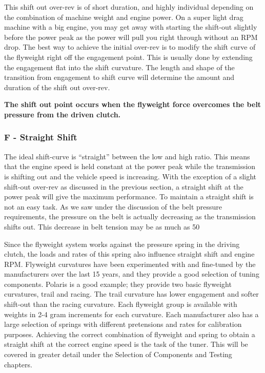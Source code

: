 \documentclass[12pt, titlepage]{article}
\begin{document}
This shift out over-rev is of short duration, and highly individual depending on the combination of machine weight and engine power. On a super light drag machine with a big engine, you may get away with starting the shift-out slightly before the power peak as the power will pull you right through without an RPM drop. The best way to achieve the initial over-rev is to modify the shift curve of the flyweight right off the engagement point. This is usually done by extending the engagement flat into the shift curvature. The length and shape of the transition from engagement to shift curve will determine the amount and duration of the shift out over-rev.

\textbf{The shift out point occurs when the flyweight force overcomes the belt pressure from the driven clutch.}

\subsubsection*{F - Straight Shift}

The ideal shift-curve is “straight” between the low and high ratio. This means that the engine speed is held constant at the power peak while the transmission is shifting out and the vehicle speed is increasing. With the exception of a slight shift-out over-rev as discussed in the previous section, a straight shift at the power peak will give the maximum performance. To maintain a straight shift is not an easy task. As we saw under the discussion of the belt pressure requirements, the pressure on the belt is actually decreasing as the transmission shifts out. This decrease in belt tension may be as much as 50%

Since the flyweight system works against the pressure spring in the driving clutch, the loads and rates of this spring also influence straight shift and engine RPM. Flyweight curvatures have been experimented with and fine-tuned by the manufacturers over the last 15 years, and they provide a good selection of tuning components. Polaris is a good example; they provide two basic flyweight curvatures, trail and racing. The trail curvature has lower engagement and softer shift-out than the racing curvature. Each flyweight group is available with weights in 2-4 gram increments for each curvature. Each manufacturer also has a large selection of springs with different pretensions and rates for calibration purposes. Achieving the correct combination of flyweight and spring to obtain a straight shift at the correct engine speed is the task of the tuner. This will be covered in greater detail under the Selection of Components and Testing chapters.
\end{document}
